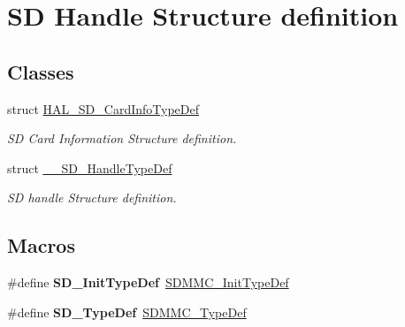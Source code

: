 \hypertarget{group___s_d___exported___types___group3}{}\section{SD Handle Structure definition}
\label{group___s_d___exported___types___group3}
\subsection*{Classes}
\begin{DoxyCompactItemize}
\item 
struct \mbox{\hyperlink{struct_h_a_l___s_d___card_info_type_def}{H\+A\+L\+\_\+\+S\+D\+\_\+\+Card\+Info\+Type\+Def}}
\begin{DoxyCompactList}\small\item\em SD Card Information Structure definition. \end{DoxyCompactList}\item 
struct \mbox{\hyperlink{struct_____s_d___handle_type_def}{\+\_\+\+\_\+\+S\+D\+\_\+\+Handle\+Type\+Def}}
\begin{DoxyCompactList}\small\item\em SD handle Structure definition. \end{DoxyCompactList}\end{DoxyCompactItemize}
\subsection*{Macros}
\begin{DoxyCompactItemize}
\item 
\mbox{\label{group___s_d___exported___types___group3_ga0e053bc407d4d1001b3f3125f17340f7}} 
\#define {\bfseries S\+D\+\_\+\+Init\+Type\+Def}~\mbox{\hyperlink{struct_s_d_m_m_c___init_type_def}{S\+D\+M\+M\+C\+\_\+\+Init\+Type\+Def}}
\item 
\mbox{\label{group___s_d___exported___types___group3_gaba823a712a2920fb20f03f74651d0beb}} 
\#define {\bfseries S\+D\+\_\+\+Type\+Def}~\mbox{\hyperlink{struct_s_d_m_m_c___type_def}{S\+D\+M\+M\+C\+\_\+\+Type\+Def}}
\end{DoxyCompactItemize}
